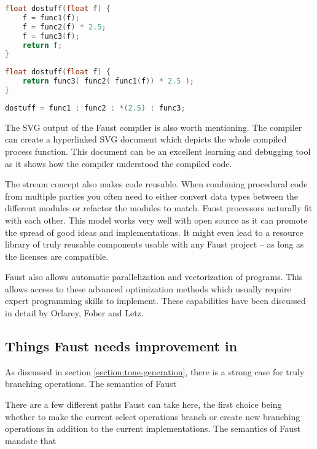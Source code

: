 \documentclass[11pt,a4paper]{article}
\begin{document}
\begin{lstlisting}[language=C,label=list:c-consec,caption=Consecutive calls]
float dostuff(float f) {
	f = func1(f);
	f = func2(f) * 2.5;
	f = func3(f);
	return f;
}
\end{lstlisting}

\begin{lstlisting}[language=C,label=list:c-enclosed,caption=Enclosed statements]
float dostuff(float f) {
	return func3( func2( func1(f)) * 2.5 );
}
\end{lstlisting}

\begin{lstlisting}[language=C,label=list:faust,caption=Faust sequential composition]
dostuff = func1 : func2 : *(2.5) : func3;
\end{lstlisting}

The SVG output of the Faust compiler is also worth mentioning. The compiler can create a hyperlinked SVG document which depicts the whole compiled process function. This document can be an excellent learning and debugging tool as it shows how the compiler understood the compiled code.

The stream concept also makes code reusable. When combining procedural code from multiple parties you often need to either convert data types between the different modules or refactor the modules to match. Faust processors naturally fit with each other. This model works very well with open source as it can promote the spread of good ideas and implementations. It might even lead to a resource library of truly reusable components usable with any Faust project -- as long as the licenses are compatible.

Faust also allows automatic parallelization and vectorization of programs. This allows access to these advanced optimization methods which usually require expert programming skills to implement. These capabilities have been discussed in detail by Orlarey, Fober and Letz\cite{orlarey:09a}.

\subsection{Things Faust needs improvement in}

As discussed in section \ref{section:tone-generation}, there is a strong case for truly branching operations. The semantics of Faust

There are a few different paths Faust can take here, the first choice being whether to make the current select operations branch or create new branching operations in addition to the current implementations. The semantics of Faust mandate that 
\end{document}
